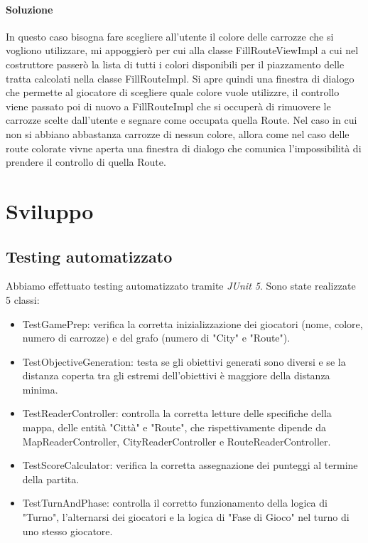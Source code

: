 \documentclass[a4paper,12pt]{report}
\begin{document}
\subsubsection{Soluzione}
In questo caso bisogna fare scegliere all'utente il colore delle carrozze che si vogliono utilizzare, mi appoggierò per cui alla classe FillRouteViewImpl a cui nel costruttore passerò la lista di tutti i colori disponibili per il piazzamento delle tratta calcolati nella classe FillRouteImpl.
Si apre quindi una finestra di dialogo che permette al giocatore di scegliere quale colore vuole utilizzre, il controllo viene passato poi di nuovo a FillRouteImpl che si occuperà di rimuovere le carrozze scelte dall'utente e segnare come occupata quella Route.
Nel caso in cui non si abbiano abbastanza carrozze di nessun colore, allora come nel caso delle route colorate vivne aperta una finestra di dialogo che comunica l'impossibilità di prendere il controllo di quella Route.
%
\newpage

\chapter{Sviluppo}
\section{Testing automatizzato}

Abbiamo effettuato testing automatizzato tramite \textit{JUnit 5}. Sono state realizzate 5 classi:
\begin{itemize}
    \item TestGamePrep: verifica la corretta inizializzazione dei giocatori (nome, colore, numero di carrozze) e del grafo (numero di "City" e "Route").
    \item TestObjectiveGeneration: testa  se gli obiettivi generati sono diversi e se la distanza coperta tra gli estremi dell'obiettivi è maggiore della distanza minima.
    \item TestReaderController: controlla la corretta letture delle specifiche della mappa, delle entità "Città" e "Route", che rispettivamente dipende da MapReaderController, CityReaderController e RouteReaderController.
    \item TestScoreCalculator: verifica la corretta assegnazione dei punteggi al termine della partita.
    \item TestTurnAndPhase: controlla il corretto funzionamento della logica di "Turno", l'alternarsi dei giocatori e la logica di "Fase di Gioco" nel turno di uno stesso giocatore.
\end{itemize}
\end{document}
